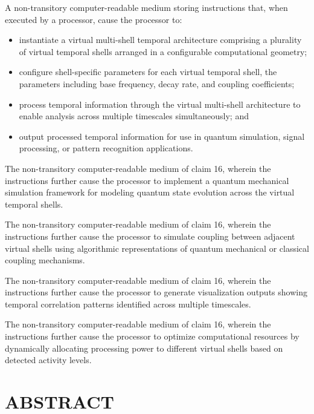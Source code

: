 \documentclass[12pt,letterpaper]{article}
\begin{document}
\begin{patentclaims}
    \item A non-transitory computer-readable medium storing instructions that, when executed by a processor, cause the processor to:
    \begin{itemize}[leftmargin=2em]
        \item instantiate a virtual multi-shell temporal architecture comprising a plurality of virtual temporal shells arranged in a configurable computational geometry;
        \item configure shell-specific parameters for each virtual temporal shell, the parameters including base frequency, decay rate, and coupling coefficients;
        \item process temporal information through the virtual multi-shell architecture to enable analysis across multiple timescales simultaneously; and
        \item output processed temporal information for use in quantum simulation, signal processing, or pattern recognition applications.
    \end{itemize}
    
    \item The non-transitory computer-readable medium of claim 16, wherein the instructions further cause the processor to implement a quantum mechanical simulation framework for modeling quantum state evolution across the virtual temporal shells.
    
    \item The non-transitory computer-readable medium of claim 16, wherein the instructions further cause the processor to simulate coupling between adjacent virtual shells using algorithmic representations of quantum mechanical or classical coupling mechanisms.
    
    \item The non-transitory computer-readable medium of claim 16, wherein the instructions further cause the processor to generate visualization outputs showing temporal correlation patterns identified across multiple timescales.
    
    \item The non-transitory computer-readable medium of claim 16, wherein the instructions further cause the processor to optimize computational resources by dynamically allocating processing power to different virtual shells based on detected activity levels.
\end{patentclaims}

\newpage
\section*{ABSTRACT}
\end{document}
